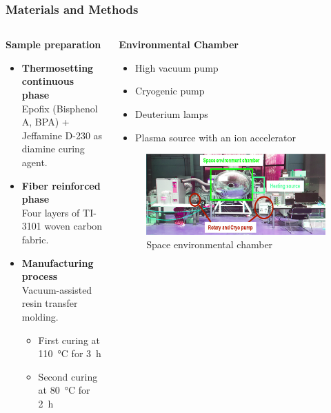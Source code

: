 \documentclass[10pt]{beamer}
\begin{document}
\begin{frame}[label=mm]
\frametitle{Materials and Methods}
\begin{columns}
\begin{column}{0.5\textwidth}
\textbf{Sample preparation}\\
\begin{itemize}
\item \textbf{Thermosetting continuous phase}\\
Epofix (Bisphenol A, BPA) + Jeffamine D-230 as diamine curing agent. 

\item \textbf{Fiber reinforced phase}\\
Four layers of TI-3101 woven carbon fabric.

\item \textbf{Manufacturing process}\\
Vacuum-assisted resin transfer molding.
\begin{itemize}
\item First curing at \SI{110}{\degreeCelsius} for \SI{3}{\hour}
\item Second curing at \SI{80}{\degreeCelsius} for \SI{2}{\hour}
\end{itemize}
\end{itemize}   
\end{column}

\begin{column}{0.5\textwidth}
\textbf{Environmental Chamber}\\

\begin{itemize}
\item High vacuum pump 
\item Cryogenic pump	
\item Deuterium lamps	
\item Plasma source with an ion accelerator 
\end{itemize}
\begin{figure}[H]
\centering
\includegraphics[width=0.9\linewidth]{figures/screenshot003}
\caption{Space environmental chamber}
\label{fig:screenshot003}
\end{figure}
\end{column}
\end{columns}
\end{frame}
\end{document}
